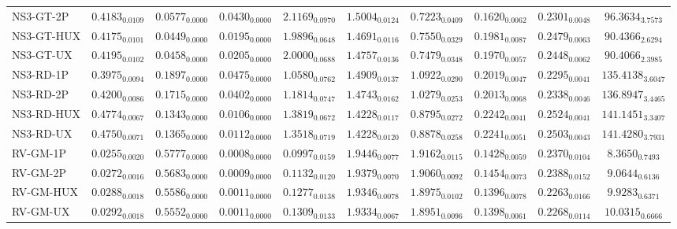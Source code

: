 \begin{longtable}{@{}lccccccccc@{}}
NS3-GT-2P & $0.4183_{0.0109}$ & $0.0577_{0.0000}$ & $0.0430_{0.0000}$ & $2.1169_{0.0970}$ & $1.5004_{0.0124}$ & $0.7223_{0.0409}$ & $0.1620_{0.0062}$ & $0.2301_{0.0048}$ & $96.3634_{3.7573}$ \\
NS3-GT-HUX & $0.4175_{0.0101}$ & $\mathbf{0.0449}_{0.0000}$ & $0.0195_{0.0000}$ & $1.9896_{0.0648}$ & $1.4691_{0.0116}$ & $0.7550_{0.0329}$ & $0.1981_{0.0087}$ & $0.2479_{0.0063}$ & $90.4366_{2.6294}$ \\
NS3-GT-UX & $0.4195_{0.0102}$ & $0.0458_{0.0000}$ & $0.0205_{0.0000}$ & $2.0000_{0.0688}$ & $1.4757_{0.0136}$ & $0.7479_{0.0348}$ & $0.1970_{0.0057}$ & $0.2448_{0.0062}$ & $90.4066_{2.3985}$ \\
NS3-RD-1P & $0.3975_{0.0094}$ & $0.1897_{0.0000}$ & $0.0475_{0.0000}$ & $1.0580_{0.0762}$ & $1.4909_{0.0137}$ & $1.0922_{0.0290}$ & $0.2019_{0.0047}$ & $0.2295_{0.0041}$ & $135.4138_{3.6047}$ \\
NS3-RD-2P & $0.4200_{0.0086}$ & $0.1715_{0.0000}$ & $0.0402_{0.0000}$ & $1.1814_{0.0747}$ & $1.4743_{0.0162}$ & $1.0279_{0.0253}$ & $0.2013_{0.0068}$ & $0.2338_{0.0046}$ & $136.8947_{3.4465}$ \\
NS3-RD-HUX & $0.4774_{0.0067}$ & $0.1343_{0.0000}$ & $0.0106_{0.0000}$ & $1.3819_{0.0672}$ & $\mathbf{1.4228}_{0.0117}$ & $0.8795_{0.0272}$ & $0.2242_{0.0041}$ & $0.2524_{0.0041}$ & $141.1451_{3.3407}$ \\
NS3-RD-UX & $0.4750_{0.0071}$ & $0.1365_{0.0000}$ & $0.0112_{0.0000}$ & $1.3518_{0.0719}$ & $1.4228_{0.0120}$ & $0.8878_{0.0258}$ & $0.2241_{0.0051}$ & $0.2503_{0.0043}$ & $\mathbf{141.4280}_{3.7931}$ \\
RV-GM-1P & $0.0255_{0.0020}$ & $0.5777_{0.0000}$ & $0.0008_{0.0000}$ & $0.0997_{0.0159}$ & $1.9446_{0.0077}$ & $1.9162_{0.0115}$ & $0.1428_{0.0059}$ & $0.2370_{0.0104}$ & $8.3650_{0.7493}$ \\
RV-GM-2P & $0.0272_{0.0016}$ & $0.5683_{0.0000}$ & $0.0009_{0.0000}$ & $0.1132_{0.0120}$ & $1.9379_{0.0070}$ & $1.9060_{0.0092}$ & $0.1454_{0.0073}$ & $0.2388_{0.0152}$ & $9.0644_{0.6136}$ \\
RV-GM-HUX & $0.0288_{0.0018}$ & $0.5586_{0.0000}$ & $0.0011_{0.0000}$ & $0.1277_{0.0138}$ & $1.9346_{0.0078}$ & $1.8975_{0.0102}$ & $0.1396_{0.0078}$ & $0.2263_{0.0166}$ & $9.9283_{0.6371}$ \\
RV-GM-UX & $0.0292_{0.0018}$ & $0.5552_{0.0000}$ & $0.0011_{0.0000}$ & $0.1309_{0.0133}$ & $1.9334_{0.0067}$ & $1.8951_{0.0096}$ & $0.1398_{0.0061}$ & $0.2268_{0.0114}$ & $10.0315_{0.6666}$ \\

\end{longtable}
